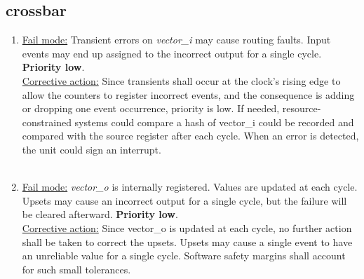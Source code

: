 \subsection{crossbar}
\begin{enumerate}

\item \underline{Fail mode:} Transient errors on \textit{vector\_i} may cause routing faults. Input events may end up assigned to the incorrect output for a single cycle.\textbf{ Priority low}.\\
\underline{Corrective action:} 
Since transients shall occur at the clock's rising edge to allow the counters to register incorrect events, and the consequence is adding or dropping one event occurrence, priority is low. If needed, resource-constrained systems could compare a hash of vector\_i could be recorded and compared with the source register after each cycle. When an error is detected, the unit could sign an interrupt.\\
\\
\item \underline{Fail mode:} \textit{vector\_o} is internally registered. Values are updated at each cycle. Upsets may cause an incorrect output for a single cycle, but the failure will be cleared afterward. \textbf{Priority low}.\\
\underline{Corrective action:} Since vector\_o is updated at each cycle, no further action shall be taken to correct the upsets. Upsets may cause a single event to have an unreliable value for a single cycle. Software safety margins shall account for such small tolerances.\\
\\
\end{enumerate}
